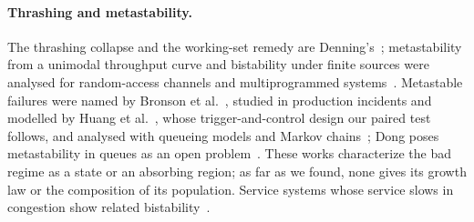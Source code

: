 \paragraph{Thrashing and metastability.} The thrashing collapse and the working-set remedy are Denning's~\citep{denning1968thrashing,%
denning1968working}; metastability from a unimodal throughput curve and bistability under finite sources were analysed for
random-access channels and multiprogrammed systems~\citep{kleinrock1975aloha,carleial1975bistable,courtois1975decomposability,%
nelson1987stochastic}. Metastable failures were named by Bronson et al.~\citep{bronson2021metastable}, studied in production
incidents and modelled by Huang et al.~\citep{huang2022metastable}, whose trigger-and-control design our paired test follows, and
analysed with queueing models and Markov chains~\citep{isaacs2025analyzing,habibi2024msf,alvaro2025formal}; Dong poses metastability
in queues as an open problem~\citep{dong2022metastability}. These works characterize the bad regime as a state or an absorbing
region; as far as we found, none gives its growth law or the composition of its population. Service systems whose service slows in
congestion show related bistability~\citep{chan2014speedup,dong2015slowdowns}.


